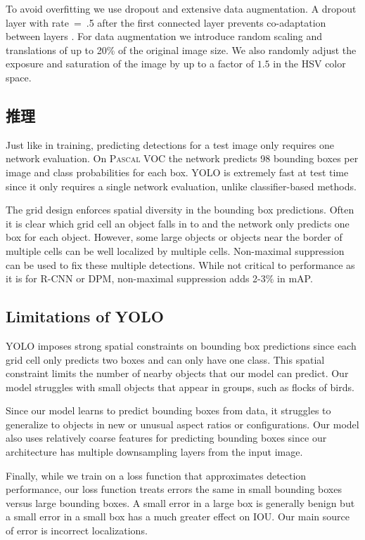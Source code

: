 \documentclass[10pt,twocolumn,letterpaper]{article}
\begin{document}
To avoid overfitting we use dropout and extensive data augmentation. A dropout layer with rate~=~.5 after the first connected layer prevents co-adaptation between layers \cite{hinton2012improving}. For data augmentation we introduce random scaling and translations of up to 20\% of the original image size. We also randomly adjust the exposure and saturation of the image by up to a factor of $1.5$ in the HSV color space.

\subsection{推理}

Just like in training, predicting detections for a test image only requires one network evaluation. On \textsc{Pascal} VOC the network predicts 98 bounding boxes per image and class probabilities for each box. YOLO is extremely fast at test time since it only requires a single network evaluation, unlike classifier-based methods.

The grid design enforces spatial diversity in the bounding box predictions. Often it is clear which grid cell an object falls in to and the network only predicts one box for each object. However, some large objects or objects near the border of multiple cells can be well localized by multiple cells. Non-maximal suppression can be used to fix these multiple detections. While not critical to performance as it is for R-CNN or DPM, non-maximal suppression adds 2-3\% in mAP.

\subsection{Limitations of YOLO}

YOLO imposes strong spatial constraints on bounding box predictions since each grid cell only predicts two boxes and can only have one class. This spatial constraint limits the number of nearby objects that our model can predict. Our model struggles with small objects that appear in groups, such as flocks of birds.

Since our model learns to predict bounding boxes from data, it struggles to generalize to objects in new or unusual aspect ratios or configurations. Our model also uses relatively coarse features for predicting bounding boxes since our architecture has multiple downsampling layers from the input image.

Finally, while we train on a loss function that approximates detection performance, our loss function treats errors the same in small bounding boxes versus large bounding boxes. A small error in a large box is generally benign but a small error in a small box has a much greater effect on IOU. Our main source of error is incorrect localizations.
\end{document}
